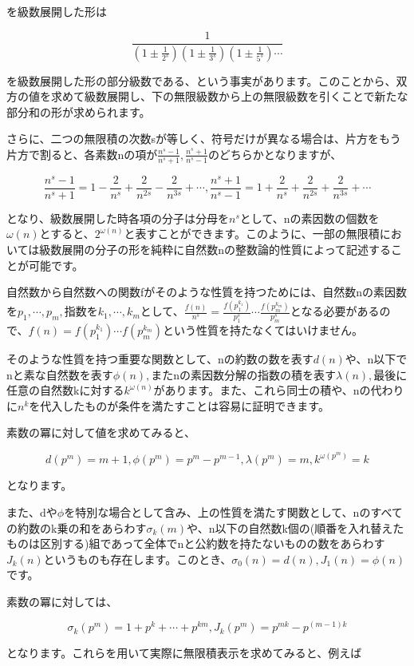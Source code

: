 \documentclass[./main]{subfiles}
\theoremstyle{break}
\begin{document}
を級数展開した形は

\[\frac{1}{\left( 1\pm \frac{1}{2^s} \right)\left( 1\pm \frac{1}{3^s} \right)\left( 1\pm\frac{1}{5^s} \right)\cdots}\]

を級数展開した形の部分級数である、という事実があります。このことから、双方の値を求めて級数展開し、下の無限級数から上の無限級数を引くことで新たな部分和の形が求められます。

さらに、二つの無限積の次数sが等しく、符号だけが異なる場合は、片方をもう片方で割ると、各素数nの項が$\displaystyle\frac{n^s-1}{n^s+1},\frac{n^s+1}{n^s-1}$のどちらかとなりますが、

\[\frac{n^s-1}{n^s+1}=1-\frac{2}{n^s}+\frac{2}{n^{2s}}-\frac{2}{n^{3s}}+\cdots,\frac{n^s+1}{n^s-1}=1+\frac{2}{n^s}+\frac{2}{n^{2s}}+\frac{2}{n^{3s}}+\cdots\]

となり、級数展開した時各項の分子は分母を$n^s$として、nの素因数の個数を$\omega(n)$とすると、$2^{\omega(n)}$と表すことができます。このように、一部の無限積においては級数展開の分子の形を純粋に自然数nの整数論的性質によって記述することが可能です。

自然数から自然数への関数fがそのような性質を持つためには、自然数nの素因数を$p_1,\cdots,p_m,$指数を$k_1,\cdots,k_m$として、$\displaystyle\frac{f(n)}{n^s}=\frac{f(p_1^{k_1})}{p_1^s}\cdots\frac{f(p_m^{k_m})}{p_m^s}$となる必要があるので、$f(n)=f(p_1^{k_1})\cdots f(p_m^{k_m})$という性質を持たなくてはいけません。

そのような性質を持つ重要な関数として、nの約数の数を表す$d(n)$や、n以下でnと素な自然数を表す$\phi(n),$またnの素因数分解の指数の積を表す$\lambda(n),$最後に任意の自然数kに対する$k^{\omega(n)}$があります。また、これら同士の積や、nの代わりに$n^k$を代入したものが条件を満たすことは容易に証明できます。

素数の冪に対して値を求めてみると、

\[d(p^m)=m+1,\phi(p^m)=p^m-p^{m-1},\lambda(p^m)=m,k^{\omega(p^m)}=k\]

となります。

また、dや$\phi$を特別な場合として含み、上の性質を満たす関数として、nのすべての約数のk乗の和をあらわす$\sigma_k(m)$や、n以下の自然数k個の(順番を入れ替えたものは区別する)組であって全体でnと公約数を持たないものの数をあらわす$J_k(n)$というものも存在します。このとき、$\sigma_0(n)=d(n),J_1(n)=\phi(n)$です。

素数の冪に対しては、

\[\sigma_k(p^m)=1+p^k+\cdots+p^{km},J_k(p^m)=p^{mk}-p^{(m-1)k}\]

となります。これらを用いて実際に無限積表示を求めてみると、例えば
\end{document}
